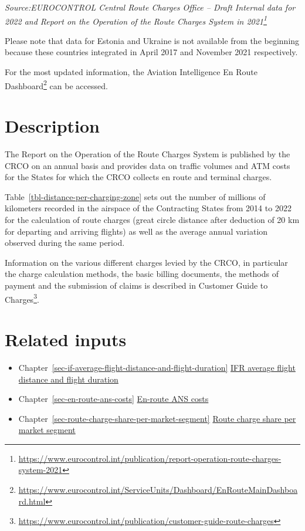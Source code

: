 \documentclass[
  11pt,
  a4paper,
]{book}
\DeclareRobustCommand{\href}[2]{#2\footnote{\url{#1}}}
\begin{document}
\begin{minipage}{\linewidth}
\emph{Source:EUROCONTROL Central Route Charges Office -- Draft Internal data for 2022 and \href{https://www.eurocontrol.int/publication/report-operation-route-charges-system-2021}{Report on the Operation of the Route Charges System in 2021}}\\
\end{minipage}

Please note that data for Estonia and Ukraine is not available from the
beginning because these countries integrated in April 2017 and November
2021 respectively.

For the most updated information, the
\href{https://www.eurocontrol.int/ServiceUnits/Dashboard/EnRouteMainDashboard.html}{Aviation
Intelligence En Route Dashboard} can be accessed.

\hypertarget{description-2}{%
\section{Description}\label{description-2}}

The Report on the Operation of the Route Charges System is published by
the CRCO on an annual basis and provides data on traffic volumes and ATM
costs for the States for which the CRCO collects en route and terminal
charges.

Table~\ref{tbl-distance-per-charging-zone} sets out the number of
millions of kilometers recorded in the airspace of the Contracting
States from 2014 to 2022 for the calculation of route charges (great
circle distance after deduction of 20 km for departing and arriving
flights) as well as the average annual variation observed during the
same period.

Information on the various different charges levied by the CRCO, in
particular the charge calculation methods, the basic billing documents,
the methods of payment and the submission of claims is described in
\href{https://www.eurocontrol.int/publication/customer-guide-route-charges}{Customer
Guide to Charges}.

\hypertarget{related-inputs-11}{%
\section{Related inputs}\label{related-inputs-11}}

\begin{itemize}
\item
  Chapter~\ref{sec-if-average-flight-distance-and-flight-duration}
  \protect\hyperlink{sec-if-average-flight-distance-and-flight-duration}{IFR
  average flight distance and flight duration}
\item
  Chapter~\ref{sec-en-route-ans-costs}
  \protect\hyperlink{sec-en-route-ans-costs}{En-route ANS costs}
\item
  Chapter~\ref{sec-route-charge-share-per-market-segment}
  \protect\hyperlink{sec-route-charge-share-per-market-segment}{Route
  charge share per market segment}
\end{itemize}
\end{document}
